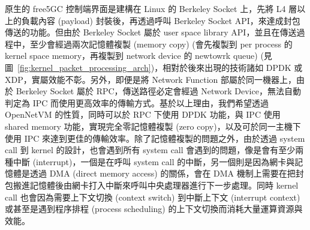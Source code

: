 
原生的 free5GC 控制端界面是建構在 Linux 的 Berkeley Socket 上，先將 L4 層以上的負載內容 (payload) 封裝後，再透過呼叫 Berkeley Socket API，來達成封包傳送的功能。但由於 Berkeley Socket 屬於 user space library API，並且在傳送過程中，至少會經過兩次記憶體複製 (memory copy) (會先複製到 per process 的 kernel space memory，再複製到 network device 的 newtowrk queue) (見圖~\ref{fig:kernel_packet_processing_arch})，相對於後來出現的技術諸如 DPDK 或 XDP，實屬效能不彰。另外，即便是將 Network Function 部屬於同一機器上，由於 Berkeley Socket 屬於 RPC，傳送路徑必定會經過 Network Device，無法自動判定為 IPC 而使用更高效率的傳輸方式。基於以上理由，我們希望透過 OpenNetVM 的性質，同時可以於 RPC 下使用 DPDK 功能，與 IPC 使用 shared memory 功能，實現完全零記憶體複製 (zero copy)，以及可於同一主機下使用 IPC 來達到更佳的傳輸效率。除了記憶體複製的問題之外，由於透過 system call 到 kernel 的設計，也會遇到所有 system call 會遇到的問題，像是會有至少兩種中斷 (interrupt)，一個是在呼叫 system call 的中斷，另一個則是因為網卡與記憶體是透過 DMA (direct memory access) 的關係，會在 DMA 機制上需要在把封包搬進記憶體後由網卡打入中斷來呼叫中央處理器進行下一步處理。同時 kernel call 也會因為需要上下文切換 (context switch) 到中斷上下文 (interrupt context) 或甚至是遇到程序排程 (process scheduling) 的上下文切換而消耗大量運算資源與效能。

